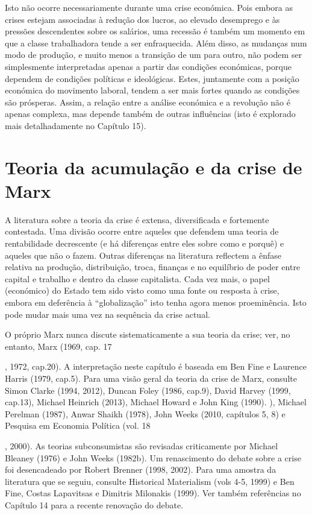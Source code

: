  \par 
Isto não ocorre necessariamente durante uma crise económica. Pois embora as crises estejam associadas à redução dos lucros, ao elevado desemprego e às pressões descendentes sobre os salários, uma recessão é também um momento em que a classe trabalhadora tende a ser enfraquecida. Além disso, as mudanças num modo de produção, e muito menos a transição de um para outro, não podem ser simplesmente interpretadas apenas a partir das condições económicas, porque dependem de condições políticas e ideológicas. Estes, juntamente com a posição económica do movimento laboral, tendem a ser mais fortes quando as condições são prósperas. Assim, a relação entre a análise económica e a revolução não é apenas complexa, mas depende também de outras influências (isto é explorado mais detalhadamente no Capítulo {\color{blue}15}).
 \par 
\section{Teoria da acumulação e da crise de Marx}
 \par 
A literatura sobre a teoria da crise é extensa, diversificada e fortemente contestada. Uma divisão ocorre entre aqueles que defendem uma teoria de rentabilidade decrescente (e há diferenças entre eles sobre como e porquê) e aqueles que não o fazem. Outras diferenças na literatura reflectem a ênfase relativa na produção, distribuição, troca, finanças e no equilíbrio de poder entre capital e trabalho e dentro da classe capitalista. Cada vez mais, o papel (económico) do Estado tem sido visto como uma fonte ou resposta à crise, embora em deferência à “globalização” isto tenha agora menos proeminência. Isto pode mudar mais uma vez na sequência da crise actual.
 \par 
O próprio Marx nunca discute sistematicamente a sua teoria da crise; ver, no entanto, Marx (1969, cap. {\color{blue} 17 } {\par} , 1972, cap.{\color{blue}20}). A interpretação neste capítulo é baseada em Ben Fine e Laurence Harris (1979, cap.{\color{blue}5}). Para uma visão geral da teoria da crise de Marx, consulte Simon Clarke (1994, 2012), Duncan Foley (1986, cap.{\color{blue}9}), David Harvey (1999, cap.{\color{blue}13}), Michael Heinrich (2013), Michael Howard e John King (1990). ), Michael Perelman (1987), Anwar Shaikh (1978), John Weeks (2010, capítulos 5, {\color{blue}8}) e Pesquisa em Economia Política (vol. {\color{blue} 18 } {\par} , 2000). As teorias subconsumistas são revisadas criticamente por Michael Bleaney (1976) e John Weeks (1982b). Um renascimento do debate sobre a crise foi desencadeado por Robert Brenner (1998, 2002). Para uma amostra da literatura que se seguiu, consulte Historical Materialism (vols 4-5, 1999) e Ben Fine, Costas Lapavitsas e Dimitris Milonakis (1999). Ver também referências no Capítulo {\color{blue}14} para a recente renovação do debate.